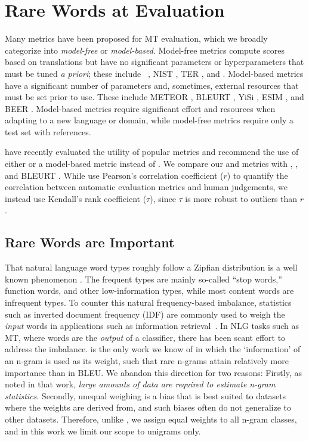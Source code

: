 \section{Rare Words at Evaluation} %
 Many metrics have been proposed for MT evaluation, which we broadly categorize into \textit{model-free} or \textit{model-based}. Model-free metrics compute scores based on translations but have no significant parameters or hyperparameters that must be tuned \textit{a priori}; these include  \bleu\ \cite{papineni-etal-2002-bleu}, NIST \cite{doddington-2002-NIST}, TER \cite{snover2006TER}, and  \cite{popovic-2015-chrf}.  Model-based metrics have a significant number of parameters and, sometimes, external resources that must be set prior to use. These include METEOR \cite{banerjee-lavie-2005-meteor},  BLEURT \cite{sellam-etal-2020-bleurt}, YiSi \cite{lo-2019-yisi}, ESIM \cite{mathur-etal-2019-ESIM}, and BEER \cite{stanojevic-simaan-2014-beer}. Model-based metrics require significant effort and resources when adapting to a new language or domain, while model-free metrics require only a test set with references. 

\citet{mathur-etal-2020-tangled} have recently evaluated the utility of popular metrics and recommend the use of either  or a model-based metric instead of \bleu. 
We compare our  and  metrics with \bleu, , and BLEURT \cite{sellam-etal-2020-bleurt}. 
While \citet{mathur-etal-2020-tangled} use Pearson's correlation coefficient ($r$) to quantify the correlation between automatic evaluation metrics and human judgements, we instead use Kendall's rank coefficient ($\tau$), since $\tau$ is more robust to outliers than $r$ \cite{croux2010robust-correlation}. 

\subsection{Rare Words are Important}
\label{sec:rare-words}
That natural language word types roughly follow a Zipfian distribution is a well known phenomenon \cite{zipf1949human,powers-1998-zipf-apps}.
The frequent types are mainly so-called ``stop words,'' function words, and other low-information types, while most content words are infrequent types.
To counter this natural frequency-based imbalance, statistics such as inverted document frequency (IDF) are commonly used to weigh the \textit{input} words in applications such as information retrieval~\cite{Jones72specificity}.
In NLG tasks such as MT, where words are the \textit{output} of a classifier, there has been scant effort to address the imbalance.
\citet{doddington-2002-NIST} is the only work we know of in which the `information' of an n-gram is used as its weight, such that rare n-grams attain relatively more importance than in BLEU. 
We abandon this direction for two reasons:
Firstly, as noted in that work, \textit{large amounts of data are required to estimate n-gram statistics}.
Secondly, unequal weighing is a bias that is best suited to datasets where the weights are derived from, and such biases often do not generalize to other datasets.
Therefore, unlike \citet{doddington-2002-NIST}, we assign equal weights to all n-gram classes, and in this work we limit our scope to unigrams only.

